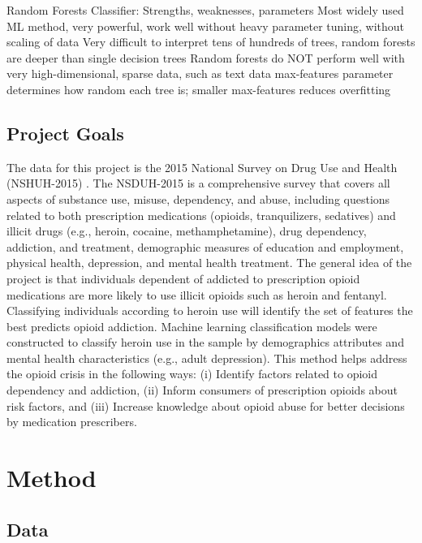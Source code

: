 \documentclass[sigconf]{acmart}
\begin{document}
Random Forests Classifier: Strengths, weaknesses, parameters
Most widely used ML method, very powerful, work well without heavy parameter tuning, without scaling of data
Very difficult to interpret tens of hundreds of trees, random forests are deeper than single decision trees
Random forests do NOT perform well with very high-dimensional, sparse data, such as text data
max-features parameter determines how random each tree is; smaller max-features reduces overfitting



\subsection{Project Goals} 

The data for this project is the 2015 National Survey on Drug Use and Health 
(NSHUH-2015) \cite{samhsa16}. The NSDUH-2015 is a comprehensive survey that 
covers all aspects of substance use, misuse, dependency, and abuse, including 
questions related to both prescription medications (opioids, tranquilizers, 
sedatives) and illicit drugs (e.g., heroin, cocaine, methamphetamine), drug 
dependency, addiction, and treatment, demographic measures of education and 
employment, physical health, depression, and mental health treatment. The 
general idea of the project is that individuals dependent of addicted to 
prescription opioid medications are more likely to use illicit opioids such 
as heroin and fentanyl. Classifying individuals according to heroin use will 
identify the set of features the best predicts opioid addiction. Machine 
learning classification models were constructed to classify heroin use 
in the sample by demographics attributes and mental health characteristics 
(e.g., adult depression). This method helps address the opioid crisis in 
the following ways: (i) Identify factors related to opioid dependency and 
addiction, (ii) Inform consumers of prescription opioids about risk factors, 
and (iii) Increase knowledge about opioid abuse for better decisions by 
medication prescribers. 


\section{Method}

\subsection{Data} 
\end{document}

